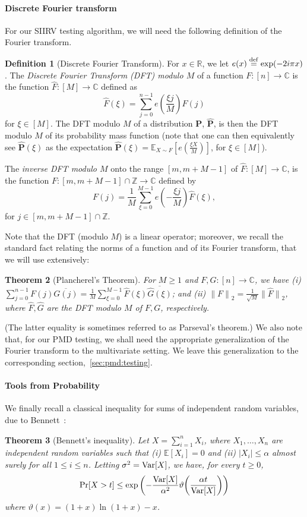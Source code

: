 \documentclass[11pt]{article}
\newtheorem{theorem}{Theorem}[section]
\theoremstyle{definition}
\newtheorem{definition}[theorem]{Definition}
\newcommand{\R}{\mathbb{R}}
\newcommand{\C}{\mathbb{C}}
\newcommand{\Z}{\mathbb{Z}}
\newcommand{\E}{\mathbb{E}}
\newcommand{\p}{\mathbf{P}}
\newcommand{\abs}[1]{\lvert#1\rvert}
\newcommand{\norm}[1]{\lVert#1\rVert}
\newcommand{\Var}{\mathop{\textnormal{Var}}\nolimits}
\newcommand{\eqdef}{\stackrel{{\mathrm {\footnotesize def}}}{=}}
\newcommand{\normtwo}[1]{{\norm{#1}}_2}
\renewcommand{\abs}[1]{\left\lvert #1 \right\rvert}
\newcommand{\fourier}[1]{\widehat{#1}}
\begin{document}
\paragraph{Discrete Fourier transform}
For our SIIRV testing algorithm, we will need the following definition of the Fourier transform. 

\begin{definition}[Discrete Fourier Transform]
For $x \in \R$, we let $e(x) \eqdef  \exp(-2i\pi x)$. The \emph{Discrete Fourier Transform (DFT) modulo $M$} of a function
$F\colon[n] \to \C$ is  the function $\fourier{F}\colon[M]\to \C$ defined as
\[
    \fourier{F}(\xi)=\sum_{j=0}^{n-1} e\!\left(\frac{\xi j}{M}\right) F(j)
\]
for $\xi \in [M]$. The DFT modulo $M$ of a distribution $\p$, $\fourier{\p}$, is then the DFT modulo $M$ of its probability mass function (note that one can then equivalently see $\fourier{\p}(\xi)$ as the expectation $\fourier{\p}(\xi) = \E_{X\sim F}[e\!\left(\frac{\xi X}{M}\right)]$, for $\xi\in[M]$).

The \emph{inverse DFT modulo $M$} onto the range $[m,m+M-1]$ of $\fourier{F}\colon [M] \to \C$, is the function $F\colon [m, m+M-1] \cap \Z \to \C$ defined by 
\[
    F(j)= \frac{1}{M} \sum_{\xi=0}^{M-1} e\!\left(-\frac{\xi j}{M}\right) \fourier{F}(\xi),
\]
for $j \in [m, m+M-1] \cap \Z$.
\end{definition}

Note that the DFT (modulo $M$) is a linear operator; moreover, we recall the standard fact relating the norms of a function and of its Fourier transform, that we will use extensively:
\begin{theorem}[Plancherel's Theorem]
For $M\geq 1$ and $F,G\colon[n] \to \C$, we have (i) $\sum_{j=0}^{n-1} F(j)\overline{G(j)} =  \frac{1}{M}\sum_{\xi=0}^{M-1} \fourier{F}(\xi)\overline{\fourier{G}(\xi)}$; and (ii) $\normtwo{F}= \frac{1}{\sqrt{M}}\normtwo{\fourier{F}}$, 
where $\fourier{F},\fourier{G}$ are the DFT modulo $M$ of $F,G$, respectively.
\end{theorem}
\noindent(The latter equality is sometimes referred to as Parseval's theorem.) We also note that, for our PMD testing, we shall need the appropriate generalization of the Fourier transform to the multivariate setting. We leave this generalization to the corresponding section,~\cref{sec:pmd:testing}.

\paragraph{Tools from Probability}
We finally recall a classical inequality for sums of independent random variables, due to Bennett~\cite[Chapter 2]{Boucheron:13}:
\begin{theorem}[Bennett's inequality]
Let $X=\sum_{i=1}^n X_i$, where $X_1,\dots,X_n$ are independent random variables such that (i) $\E[X_i]=0$ and (ii) $\abs{X_i}\leq \alpha$ almost surely for all $1\leq i\leq n$. Letting $\sigma^2=\Var[X]$, we have, for every $t\geq 0$,
\[
    \Pr[ X > t ] \leq \exp\left( -\frac{\Var[X]}{\alpha^2} \vartheta\!\left( \frac{\alpha t}{\Var[X]} \right) \right)
\]
where $\vartheta(x)=(1+x)\ln(1+x) - x$.
\end{theorem}
\end{document}
